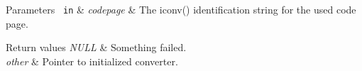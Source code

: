 \begin{DoxyParams}[1]{Parameters}
\mbox{\texttt{ in}}  & {\em codepage} & The iconv() identification string for the used code page.\\
\hline
\end{DoxyParams}

\begin{DoxyRetVals}{Return values}
{\em N\+U\+LL} & Something failed. \\
\hline
{\em other} & Pointer to initialized converter. \\
\hline
\end{DoxyRetVals}
